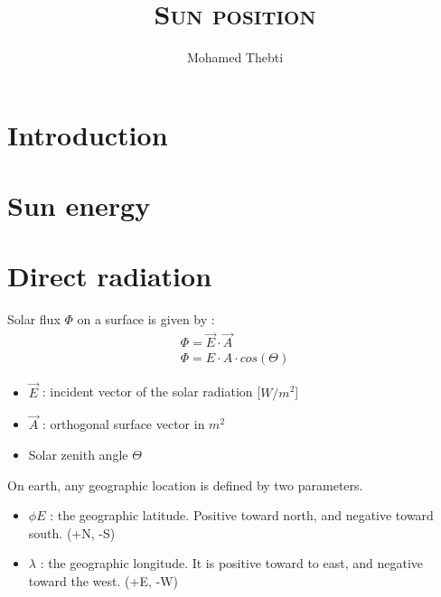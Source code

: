 \documentclass[12pt,a4paper]{article}
\title{
	\Huge\textsc{Sun position}
}
\author{Mohamed Thebti}
\begin{document}
\setlength{\parindent}{0mm}

\fancyhead[R]{\slshape \leftmark}

\fancyfoot[C]{}
\fancyfoot[R]{\thepage}

\maketitle
\newpage

\tableofcontents

\newpage



\section{Introduction}

\section{Sun energy}

\section{Direct radiation}
Solar flux $\Phi$ on a surface is given by : 
\begin{eqnarray}
\Phi = \vec{E} \cdot \vec{A} \\
\Phi = E \cdot A \cdot cos(\Theta)
\end{eqnarray}
\begin{itemize}
	\item $\vec{E}$ : incident vector of the solar radiation [$W/m^2$]
	\item $\vec{A}$ : orthogonal surface vector in $m^2$
	\item Solar zenith angle $\Theta$ 
\end{itemize}
On earth, any geographic location is defined by two parameters.
\begin{itemize}
	\item $\phi{E}$ : the geographic latitude. Positive toward north, and negative toward south. (+N, -S)
	\item $\lambda$ : the geographic longitude. It is positive toward to east, and negative toward the west. (+E, -W)
\end{itemize}
\end{document}
